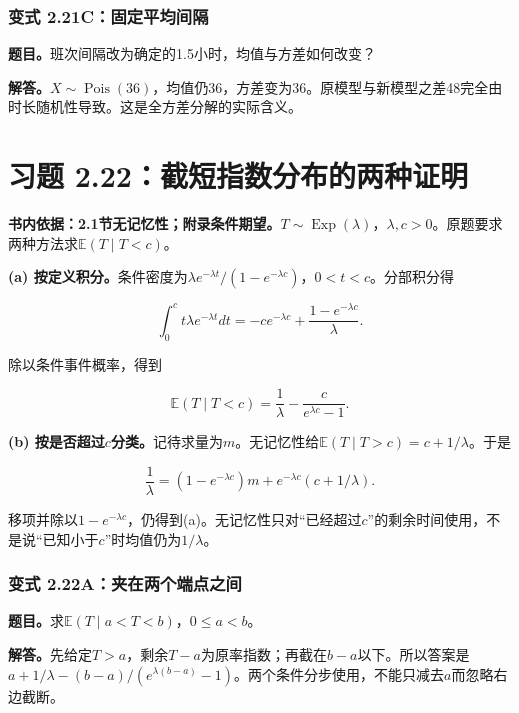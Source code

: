 \documentclass[12pt,a4paper,UTF8,fontset=fandol]{ctexart}
\begin{document}
\subsubsection{变式
2.21C：固定平均间隔}\label{ux53d8ux5f0f-2.21cux56faux5b9aux5e73ux5747ux95f4ux9694}

\textbf{题目。}班次间隔改为确定的1.5小时，均值与方差如何改变？

\textbf{解答。}\(X\sim\operatorname{Pois}(36)\)，均值仍36，方差变为36。原模型与新模型之差48完全由时长随机性导致。这是全方差分解的实际含义。

\section{习题
2.22：截短指数分布的两种证明}\label{ux4e60ux9898-2.22ux622aux77edux6307ux6570ux5206ux5e03ux7684ux4e24ux79cdux8bc1ux660e}

\textbf{书内依据：2.1节无记忆性；附录条件期望。}\(T\sim\operatorname{Exp}(\lambda)\)，\(\lambda,c>0\)。原题要求两种方法求\(\mathbb E(T\mid T<c)\)。

\textbf{(a)
按定义积分。}条件密度为\(\lambda e^{-\lambda t}/(1-e^{-\lambda c})\)，\(0<t<c\)。分部积分得

\[
\int_0^c t\lambda e^{-\lambda t}dt
=-ce^{-\lambda c}+\frac{1-e^{-\lambda c}}\lambda.
\]

除以条件事件概率，得到

\[\boxed{\mathbb E(T\mid T<c)=\frac1\lambda-\frac{c}{e^{\lambda c}-1}.}\]

\textbf{(b)
按是否超过\(c\)分类。}记待求量为\(m\)。无记忆性给\(\mathbb E(T\mid T>c)=c+1/\lambda\)。于是

\[
\frac1\lambda=(1-e^{-\lambda c})m+e^{-\lambda c}(c+1/\lambda).
\]

移项并除以\(1-e^{-\lambda c}\)，仍得到(a)。无记忆性只对``已经超过\(c\)''的剩余时间使用，不是说``已知小于\(c\)''时均值仍为\(1/\lambda\)。

\subsubsection{变式
2.22A：夹在两个端点之间}\label{ux53d8ux5f0f-2.22aux5939ux5728ux4e24ux4e2aux7aefux70b9ux4e4bux95f4}

\textbf{题目。}求\(\mathbb E(T\mid a<T<b)\)，\(0\le a<b\)。

\textbf{解答。}先给定\(T>a\)，剩余\(T-a\)为原率指数；再截在\(b-a\)以下。所以答案是\(a+1/\lambda-(b-a)/(e^{\lambda(b-a)}-1)\)。两个条件分步使用，不能只减去\(a\)而忽略右边截断。
\end{document}
